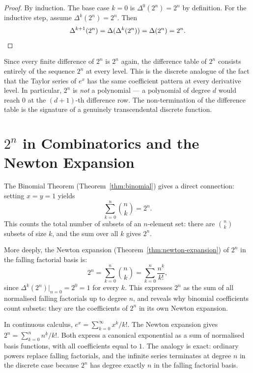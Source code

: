 \begin{proof}
By induction. The base case \(k = 0\) is \(\Delta^0(2^n) = 2^n\) by
definition. For the inductive step, assume \(\Delta^k(2^n) = 2^n\). Then
\[
\Delta^{k+1}(2^n) = \Delta(\Delta^k(2^n)) = \Delta(2^n) = 2^n. \qedhere
\]
\end{proof}

\begin{remark*}
Since every finite difference of \(2^n\) is \(2^n\) again, the difference
table of \(2^n\) consists entirely of the sequence \(2^n\) at every level.
This is the discrete analogue of the fact that the Taylor series of \(e^x\)
has the same coefficient pattern at every derivative level. In particular,
\(2^n\) is \emph{not} a polynomial — a polynomial of degree \(d\) would
reach \(0\) at the \((d+1)\)-th difference row. The non-termination of
the difference table is the signature of a genuinely transcendental discrete
function.
\end{remark*}

\section*{\(2^n\) in Combinatorics and the Newton Expansion}

The Binomial Theorem (Theorem~\ref{thm:binomial}) gives a direct connection:
setting \(x = y = 1\) yields
\[
\sum_{k=0}^{n} \binom{n}{k} = 2^n.
\]
This counts the total number of subsets of an \(n\)-element set: there are
\(\binom{n}{k}\) subsets of size \(k\), and the sum over all \(k\) gives
\(2^n\).

More deeply, the Newton expansion (Theorem~\ref{thm:newton-expansion}) of \(2^n\)
in the falling factorial basis is:
\[
2^n = \sum_{k=0}^{n} \binom{n}{k} = \sum_{k=0}^{n} \frac{n^{\underline{k}}}{k!},
\]
since \(\Delta^k(2^n)\big|_{n=0} = 2^0 = 1\) for every \(k\). This expresses
\(2^n\) as the sum of all normalised falling factorials up to degree \(n\),
and reveals why binomial coefficients count subsets: they are the coefficients
of \(2^n\) in its own Newton expansion.

\begin{remark*}
In continuous calculus, \(e^x = \sum_{k=0}^{\infty} x^k/k!\). The Newton
expansion gives \(2^n = \sum_{k=0}^{n} n^{\underline{k}}/k!\). Both express
a canonical exponential as a sum of normalised basis functions, with all
coefficients equal to \(1\). The analogy is exact: ordinary powers replace
falling factorials, and the infinite series terminates at degree \(n\) in
the discrete case because \(2^n\) has degree exactly \(n\) in the falling
factorial basis.
\end{remark*}

